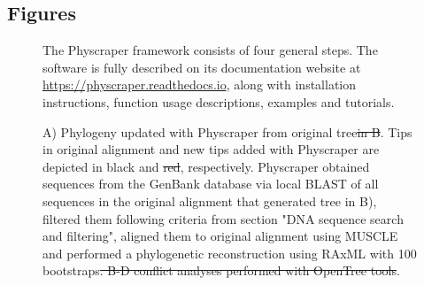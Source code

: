\documentclass{bmcart}
\providecommand{\DIFaddtex}[1]{{\protect\color{blue}\uwave{#1}}} %
\providecommand{\DIFdeltex}[1]{{\protect\color{red}\sout{#1}}}                      %
\providecommand{\DIFaddFL}[1]{\DIFadd{#1}} %
\providecommand{\DIFdelFL}[1]{\DIFdel{#1}} %
\providecommand{\DIFaddbeginFL}{} %
\providecommand{\DIFaddendFL}{} %
\providecommand{\DIFdelbeginFL}{} %
\providecommand{\DIFdelendFL}{} %
\providecommand{\DIFadd}[1]{\texorpdfstring{\DIFaddtex{#1}}{#1}} %
\providecommand{\DIFdel}[1]{\texorpdfstring{\DIFdeltex{#1}}{}} %
\begin{document}
\begin{backmatter}



\section*{Figures}
  \begin{figure}[h!]
  \caption{The Physcraper framework consists of four general steps. The software is fully
  described on its documentation website at \href{https://physcraper.readthedocs.io}{https://physcraper.readthedocs.io},
  along with installation instructions, function usage descriptions, examples and tutorials.
}
\end{figure}

\begin{figure}[h!]
  \caption{A) Phylogeny updated with Physcraper from original
  \cite{gottlieb2005molecular} tree\DIFdelbeginFL \DIFdelFL{in B}\DIFdelendFL .
  Tips in original alignment and new tips added with Physcraper are depicted in
  black and \DIFdelbeginFL \DIFdelFL{red}\DIFdelendFL \DIFaddbeginFL \DIFaddFL{golden}\DIFaddendFL , respectively. Physcraper obtained sequences from the GenBank
  database via local BLAST of all sequences in the original alignment that generated
  tree in B), filtered them following criteria from section "DNA sequence search and
  filtering", aligned them to original alignment using MUSCLE and performed a
  phylogenetic reconstruction using RAxML with 100 bootstraps\DIFdelbeginFL \DIFdelFL{. B-D conflict analyses
  performed with OpenTree tools}\DIFdelendFL .}
\end{figure}


\end{backmatter}
\end{document}
